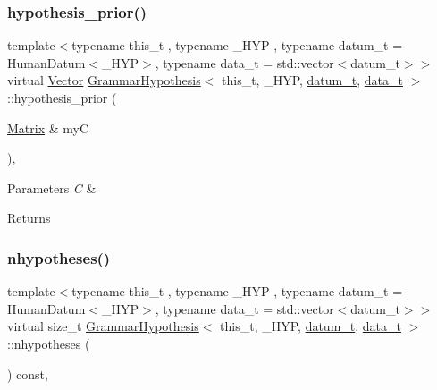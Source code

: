 \subsubsection{\texorpdfstring{hypothesis\+\_\+prior()}{hypothesis\_prior()}}
{\footnotesize\ttfamily template$<$typename this\+\_\+t , typename \+\_\+\+H\+YP , typename datum\+\_\+t  = Human\+Datum$<$\+\_\+\+H\+Y\+P$>$, typename data\+\_\+t  = std\+::vector$<$datum\+\_\+t$>$$>$ \\
virtual \hyperlink{_eigen_lib_8h_aca2956bc379bce2ed88ab3c0e1b61d1d}{Vector} \hyperlink{class_grammar_hypothesis}{Grammar\+Hypothesis}$<$ this\+\_\+t, \+\_\+\+H\+YP, \hyperlink{class_bayesable_a9f1a6c0cd7855550fa10b1a8f13a5867}{datum\+\_\+t}, \hyperlink{class_bayesable_aa2788c4d7718c0a824e1d28c4c98f921}{data\+\_\+t} $>$\+::hypothesis\+\_\+prior (\begin{DoxyParamCaption}\item[{\hyperlink{_eigen_lib_8h_a645222978e81acfb2523a9bce34aecc0}{Matrix} \&}]{myC }\end{DoxyParamCaption})\hspace{0.3cm}{\ttfamily [inline]}, {\ttfamily [virtual]}}


\begin{DoxyParams}{Parameters}
{\em C} & \\
\hline
\end{DoxyParams}
\begin{DoxyReturn}{Returns}

\end{DoxyReturn}
\mbox{\label{class_grammar_hypothesis_a887f646d5c07a485721d7b89bb166274}} 
\subsubsection{\texorpdfstring{nhypotheses()}{nhypotheses()}}
{\footnotesize\ttfamily template$<$typename this\+\_\+t , typename \+\_\+\+H\+YP , typename datum\+\_\+t  = Human\+Datum$<$\+\_\+\+H\+Y\+P$>$, typename data\+\_\+t  = std\+::vector$<$datum\+\_\+t$>$$>$ \\
virtual size\+\_\+t \hyperlink{class_grammar_hypothesis}{Grammar\+Hypothesis}$<$ this\+\_\+t, \+\_\+\+H\+YP, \hyperlink{class_bayesable_a9f1a6c0cd7855550fa10b1a8f13a5867}{datum\+\_\+t}, \hyperlink{class_bayesable_aa2788c4d7718c0a824e1d28c4c98f921}{data\+\_\+t} $>$\+::nhypotheses (\begin{DoxyParamCaption}{ }\end{DoxyParamCaption}) const\hspace{0.3cm}{\ttfamily [inline]}, {\ttfamily [virtual]}}



